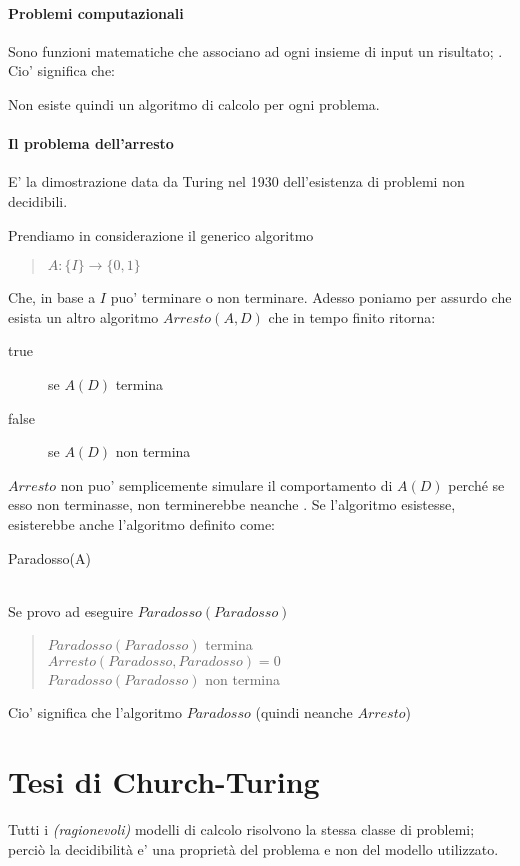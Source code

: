 \paragraph{Problemi computazionali}
Sono funzioni matematiche che associano ad ogni insieme di input un risultato; .
Cio' significa che:
\begin{center}
\end{center}
Non esiste quindi un algoritmo di calcolo per ogni problema.
\paragraph{Il problema dell'arresto}
E' la dimostrazione data da Turing nel 1930 dell'esistenza di problemi non decidibili.

Prendiamo in considerazione il generico algoritmo
\begin{quote}
    $A: \{I\} \rightarrow \{0, 1\}$
\end{quote}
Che, in base a $I$ puo' terminare o non terminare.
Adesso poniamo per assurdo che esista un altro algoritmo $Arresto(A, D)$ che in tempo finito ritorna:
\begin{description}
    \item[true] se $A(D)$ termina
    \item[false] se $A(D)$ non termina 
\end{description}
$Arresto$ non puo' semplicemente simulare il comportamento di $A(D)$ perché se esso non terminasse, non terminerebbe neanche .
    Se l'algoritmo  esistesse, esisterebbe anche l'algoritmo  definito come:
\begin{algorithm}
    \caption{Paradosso(A)}
\end{algorithm}\\
Se provo ad eseguire $Paradosso(Paradosso)$
\begin{quote}
    $Paradosso(Paradosso)$ termina\\
    $Arresto(Paradosso, Paradosso) = 0$\\
    $Paradosso(Paradosso)$ non termina
\end{quote}
Cio' significa che l'algoritmo $Paradosso$  (quindi neanche $Arresto$)
\section{Tesi di Church-Turing}
Tutti i \textit{(ragionevoli)} modelli di calcolo risolvono la stessa classe di problemi; perciò la decidibilità e' una proprietà del problema e non del modello utilizzato.